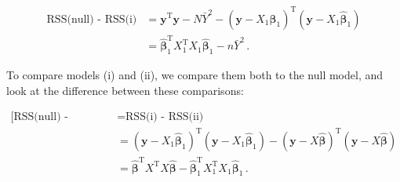 \documentclass[
]{book}
\theoremstyle{definition}
\theoremstyle{definition}
\theoremstyle{definition}
\theoremstyle{definition}
\theoremstyle{remark}
\begin{document}
\begin{enumerate}
  \begin{align*}
   \mbox{RSS(null) - RSS(i)} & = \boldsymbol{y}^{\mathrm{T}}\boldsymbol{y}- N\bar{Y}^2 - (\boldsymbol{y}- X_1\hat{\boldsymbol{\beta}}_1)^{\mathrm{T}}(\boldsymbol{y}- X_1\hat{\boldsymbol{\beta}}_1)\\
   & = \hat{\boldsymbol{\beta}}_1^{\mathrm{T}}X_1^{\mathrm{T}}X_1\hat{\boldsymbol{\beta}}_1 - n\bar{Y}^2\,.
   \end{align*}

  To compare models (i) and (ii), we compare them both to the null model, and look at the difference between these comparisons:

  \begin{align*}
   \mbox{[RSS(null) - RSS(ii)] - [RSS(null) - RSS(i)]} & = \mbox{RSS(i) - RSS(ii)}\\
   & = (\boldsymbol{y}- X_1\hat{\boldsymbol{\beta}}_1)^{\mathrm{T}}(\boldsymbol{y}- X_1\hat{\boldsymbol{\beta}}_1) - (\boldsymbol{y}- X\hat{\boldsymbol{\beta}})^{\mathrm{T}}(\boldsymbol{y}- X\hat{\boldsymbol{\beta}})\\
   & = \hat{\boldsymbol{\beta}}^{\mathrm{T}}X^{\mathrm{T}}X\hat{\boldsymbol{\beta}} - \hat{\boldsymbol{\beta}}_1^{\mathrm{T}}X_1^{\mathrm{T}}X_1\hat{\boldsymbol{\beta}}_1\,.
   \end{align*}


\end{enumerate}
\end{document}
